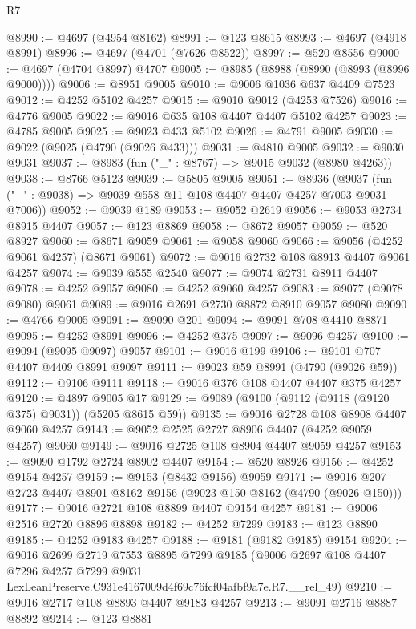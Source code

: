 \begin{lexlean}{R7}
\begin{coremodule}
@8990 := @4697 (@4954 @8162)
@8991 := @123 @8615
@8993 := @4697 (@4918 @8991)
@8996 := @4697 (@4701 (@7626 @8522))
@8997 := @520 @8556
@9000 := @4697 (@4704 @8997) @4707
@9005 := @8985 (@8988 (@8990 (@8993 (@8996 @9000))))
@9006 := @8951 @9005
@9010 := @9006 @1036 @637 @4409 @7523
@9012 := @4252 @5102 @4257
@9015 := @9010 @9012 (@4253 @7526)
@9016 := @4776 @9005
@9022 := @9016 @635 @108 @4407 @4407 @5102 @4257
@9023 := @4785 @9005
@9025 := @9023 @433 @5102
@9026 := @4791 @9005
@9030 := @9022 (@9025 (@4790 (@9026 @433)))
@9031 := @4810 @9005
@9032 := @9030 @9031
@9037 := @8983 (fun ("_" : @8767) => @9015 @9032 (@8980 @4263))
@9038 := @8766 @5123
@9039 := @5805 @9005
@9051 := @8936
    (@9037 (fun ("_" : @9038) => @9039 @558 @11 @108 @4407 @4407 @4257 @7003 @9031 @7006))
@9052 := @9039 @189
@9053 := @9052 @2619
@9056 := @9053 @2734 @8915 @4407
@9057 := @123 @8869
@9058 := @8672 @9057
@9059 := @520 @8927
@9060 := @8671 @9059
@9061 := @9058 @9060
@9066 := @9056 (@4252 @9061 @4257) (@8671 @9061)
@9072 := @9016 @2732 @108 @8913 @4407 @9061 @4257
@9074 := @9039 @555 @2540
@9077 := @9074 @2731 @8911 @4407
@9078 := @4252 @9057
@9080 := @4252 @9060 @4257
@9083 := @9077 (@9078 @9080) @9061
@9089 := @9016 @2691 @2730 @8872 @8910 @9057 @9080
@9090 := @4766 @9005
@9091 := @9090 @201
@9094 := @9091 @708 @4410 @8871
@9095 := @4252 @8991
@9096 := @4252 @375
@9097 := @9096 @4257
@9100 := @9094 (@9095 @9097) @9057
@9101 := @9016 @199
@9106 := @9101 @707 @4407 @4409 @8991 @9097
@9111 := @9023 @59 @8991 (@4790 (@9026 @59))
@9112 := @9106 @9111
@9118 := @9016 @376 @108 @4407 @4407 @375 @4257
@9120 := @4897 @9005 @17
@9129 := @9089 (@9100 (@9112 (@9118 (@9120 @375) @9031)) (@5205 @8615 @59))
@9135 := @9016 @2728 @108 @8908 @4407 @9060 @4257
@9143 := @9052 @2525 @2727 @8906 @4407 (@4252 @9059 @4257) @9060
@9149 := @9016 @2725 @108 @8904 @4407 @9059 @4257
@9153 := @9090 @1792 @2724 @8902 @4407
@9154 := @520 @8926
@9156 := @4252 @9154 @4257
@9159 := @9153 (@8432 @9156) @9059
@9171 := @9016 @207 @2723 @4407 @8901 @8162 @9156 (@9023 @150 @8162 (@4790 (@9026 @150)))
@9177 := @9016 @2721 @108 @8899 @4407 @9154 @4257
@9181 := @9006 @2516 @2720 @8896 @8898
@9182 := @4252 @7299
@9183 := @123 @8890
@9185 := @4252 @9183 @4257
@9188 := @9181 (@9182 @9185) @9154
@9204 := @9016
    @2699
    @2719
    @7553
    @8895
    @7299
    @9185
    (@9006
      @2697
      @108
      @4407
      @7296
      @4257
      @7299
      @9031
      LexLeanPreserve.C931e4167009d4f69c76fcf04afbf9a7e.R7.__rel_49)
@9210 := @9016 @2717 @108 @8893 @4407 @9183 @4257
@9213 := @9091 @2716 @8887 @8892
@9214 := @123 @8881

\end{coremodule}
\end{lexlean}
